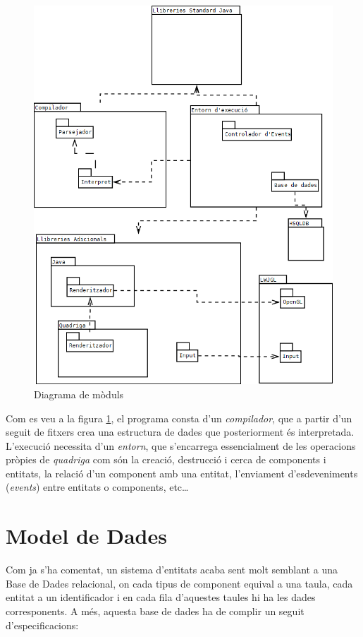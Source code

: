 \begin{figure}
  \includegraphics[width=1\linewidth]{./img/Moduls.png}
  \caption{Diagrama de mòduls \label{fig:DiagramaDeModuls}}
\end{figure}

Com es veu a la figura \ref{fig:DiagramaDeModuls}, el programa consta d'un {\em compilador}, que a partir d'un seguit de fitxers crea una estructura de dades que posteriorment és interpretada. L'execució necessita d'un {\em entorn}, que s'encarrega essencialment de les operacions pròpies de {\em quadriga} com són la creació, destrucció i cerca de components i entitats, la relació d'un component amb una entitat, l'enviament d'esdeveniments ({\em events}) entre entitats o components, etc\ldots

\section{Model de Dades}

Com ja s'ha comentat, un sistema d'entitats acaba sent molt semblant a una Base de Dades relacional, on cada tipus de component equival a una taula, cada entitat a un identificador i en cada fila d'aquestes taules hi ha les dades corresponents. A més, aquesta base de dades ha de complir un seguit d'especificacions:

